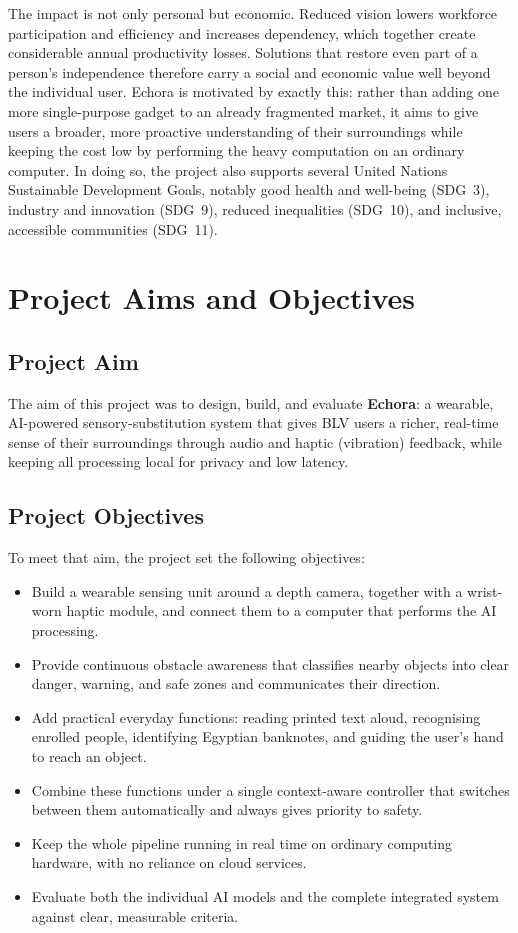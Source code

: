 The impact is not only personal but economic. Reduced vision lowers workforce participation and efficiency and increases dependency, which together create considerable annual productivity losses. Solutions that restore even part of a person's independence therefore carry a social and economic value well beyond the individual user. Echora is motivated by exactly this: rather than adding one more single-purpose gadget to an already fragmented market, it aims to give users a broader, more proactive understanding of their surroundings while keeping the cost low by performing the heavy computation on an ordinary computer. In doing so, the project also supports several United Nations Sustainable Development Goals, notably good health and well-being (SDG~3), industry and innovation (SDG~9), reduced inequalities (SDG~10), and inclusive, accessible communities (SDG~11).

\section{Project Aims and Objectives}

\subsection{Project Aim}

The aim of this project was to design, build, and evaluate \textbf{Echora}: a wearable, AI-powered sensory-substitution system that gives BLV users a richer, real-time sense of their surroundings through audio and haptic (vibration) feedback, while keeping all processing local for privacy and low latency.

\subsection{Project Objectives}

To meet that aim, the project set the following objectives:

\begin{itemize}
    \item Build a wearable sensing unit around a depth camera, together with a wrist-worn haptic module, and connect them to a computer that performs the AI processing.
    \item Provide continuous obstacle awareness that classifies nearby objects into clear danger, warning, and safe zones and communicates their direction.
    \item Add practical everyday functions: reading printed text aloud, recognising enrolled people, identifying Egyptian banknotes, and guiding the user's hand to reach an object.
    \item Combine these functions under a single context-aware controller that switches between them automatically and always gives priority to safety.
    \item Keep the whole pipeline running in real time on ordinary computing hardware, with no reliance on cloud services.
    \item Evaluate both the individual AI models and the complete integrated system against clear, measurable criteria.
\end{itemize}

